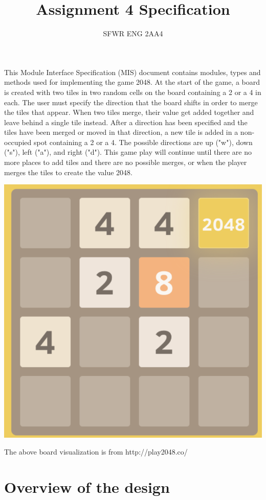 \documentclass[12pt]{article}
\title{Assignment 4 Specification}
\author{SFWR ENG 2AA4}
\begin{document}
\maketitle
This Module Interface Specification (MIS) document contains modules, types and
methods used for implementing the game 2048. At the start of the game, a board is created with two tiles 
in two random cells on the board containing a 2 or a 4 in each. The user must specify the direction that
the board shifts in order to merge the tiles that appear. When two tiles merge, their value get added 
together and leave behind a single tile instead. After a direction has been specified and the tiles
have been merged or moved in that direction, a new tile is added in a non-occupied spot containing a 2 or a
4. The possible directions are up ("w"), down ("s"), left ("a"), and right ("d"). This game play will continue
until there are no more places to add tiles and there are no possible merges, or when the player merges the 
tiles to create the value 2048. 

\begin{center}
	\includegraphics[scale=0.3]{2048_pic}
\end{center}

The above board visualization is from http://play2048.co/

\newpage

\section* {Overview of the design}
\end{document}
